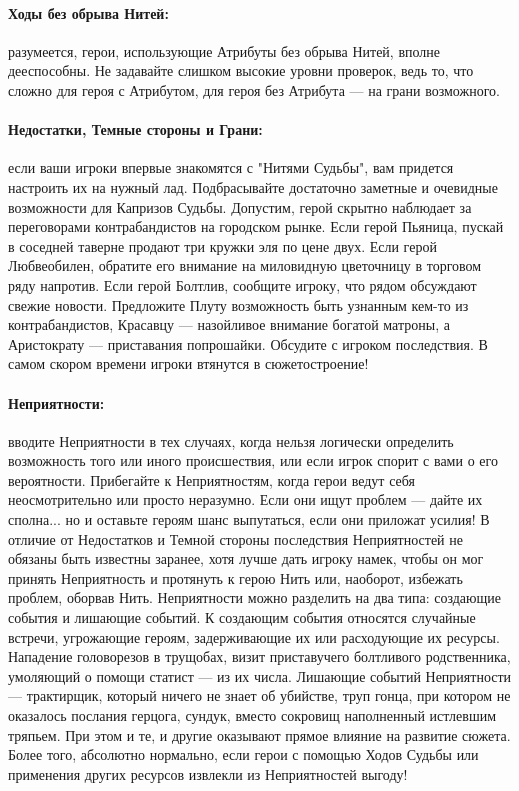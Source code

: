 \paragraph{Ходы без обрыва Нитей:} разумеется, герои, использующие Атрибуты без обрыва Нитей, вполне дееспособны. Не задавайте слишком высокие уровни проверок, ведь то, что сложно для героя с Атрибутом, для героя без Атрибута — на грани возможного.
\paragraph{Недостатки, Темные стороны и Грани:} если ваши игроки впервые знакомятся с "Нитями Судьбы", вам придется настроить их на нужный лад. Подбрасывайте достаточно заметные и очевидные возможности для Капризов Судьбы. Допустим, герой скрытно наблюдает за переговорами контрабандистов на городском рынке. Если герой Пьяница, пускай в соседней таверне продают три кружки эля по цене двух. Если герой Любвеобилен, обратите его внимание на миловидную цветочницу в торговом ряду напротив. Если герой Болтлив, сообщите игроку, что рядом обсуждают свежие новости. Предложите Плуту возможность быть узнанным кем-то из контрабандистов, Красавцу — назойливое внимание богатой матроны, а Аристократу — приставания попрошайки. Обсудите с игроком последствия. В самом скором времени игроки втянутся в сюжетостроение!
\paragraph{Неприятности:} вводите Неприятности в тех случаях, когда нельзя логически определить возможность того или иного происшествия, или если игрок спорит с вами о его вероятности. Прибегайте к Неприятностям, когда герои ведут себя неосмотрительно или просто неразумно. Если они ищут проблем — дайте их сполна... но и оставьте героям шанс выпутаться, если они приложат усилия! В отличие от Недостатков и Темной стороны последствия Неприятностей не обязаны быть известны заранее, хотя лучше дать игроку намек, чтобы он мог принять Неприятность и протянуть к герою Нить или, наоборот, избежать проблем, оборвав Нить.
\newline
Неприятности можно разделить на два типа: создающие события и лишающие событий. К создающим события относятся случайные встречи, угрожающие героям, задерживающие их или расходующие их ресурсы. Нападение головорезов в трущобах, визит приставучего болтливого родственника, умоляющий о помощи статист — из их числа. Лишающие событий Неприятности — трактирщик, который ничего не знает об убийстве, труп гонца, при котором не оказалось послания герцога, сундук, вместо сокровищ наполненный истлевшим тряпьем. При этом и те, и другие оказывают прямое влияние на развитие сюжета. Более того, абсолютно нормально, если герои с помощью Ходов Судьбы или применения других ресурсов извлекли из Неприятностей выгоду!
